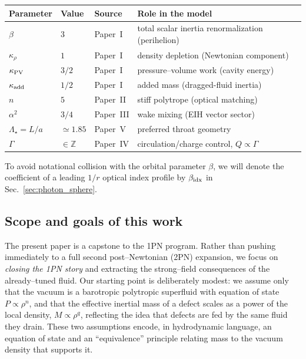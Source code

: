\documentclass[11pt]{article}
\begin{document}
\begin{center}
\begin{tabular}{llll}
\hline
Parameter & Value & Source & Role in the model \\
\hline
\(\beta\) & \(3\) & Paper~I & total scalar inertia renormalization (perihelion) \\
\(\kappa_{\rho}\) & \(1\) & Paper~I & density depletion (Newtonian component) \\
\(\kappa_{\rm PV}\) & \(3/2\) & Paper~I & pressure--volume work (cavity energy) \\
\(\kappa_{\rm add}\) & \(1/2\) & Paper~I & added mass (dragged-fluid inertia) \\
\(n\) & \(5\) & Paper~II & stiff polytrope (optical matching) \\
\(\alpha^2\) & \(3/4\) & Paper~III & wake mixing (EIH vector sector) \\
\(\Lambda_\star=L/a\) & \(\simeq 1.85\) & Paper~V & preferred throat geometry \\
\(\Gamma\) & \(\in\mathbb{Z}\) & Paper~IV & circulation/charge control, \(Q\propto\Gamma\) \\
\hline
\end{tabular}
\end{center}

To avoid notational collision with the orbital parameter \(\beta\), we will
denote the coefficient of a leading \(1/r\) optical index profile by
\(\beta_{\rm idx}\) in Sec.~\ref{sec:photon_sphere}.

\subsection{Scope and goals of this work}
\label{subsec:intro-goals}

The present paper is a capstone to the 1PN program.
Rather than pushing immediately to a full second post--Newtonian (2PN)
expansion, we focus on \emph{closing the 1PN story} and extracting the
strong--field consequences of the already--tuned fluid.  Our starting point
is deliberately modest: we assume only that the vacuum is a barotropic
polytropic superfluid with equation of state $P \propto \rho^n$, and that
the effective inertial mass of a defect scales as a power of the local
density, $M \propto \rho^q$, reflecting the idea that defects are fed by the
same fluid they drain.  These two assumptions encode, in hydrodynamic
language, an equation of state and an ``equivalence'' principle relating
mass to the vacuum density that supports it.
\end{document}
